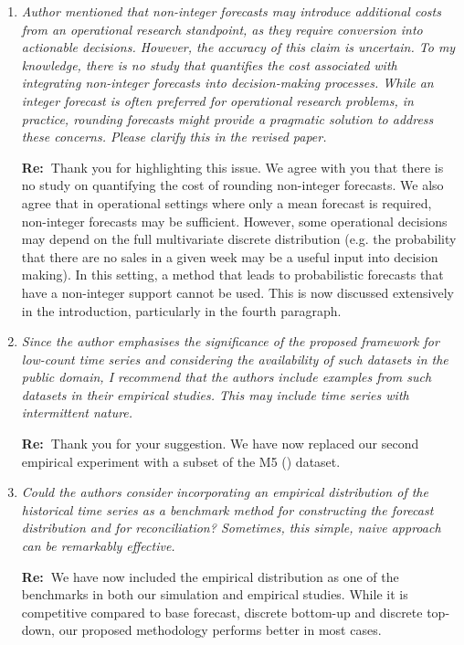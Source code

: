 \documentclass[11pt,a4paper]{article}
\newcommand{\RE}[2][Re:~]{{\color{blue}\textbf{#1}#2}}
\begin{document}
\begin{enumerate}
  \item \textit{Author mentioned that non-integer forecasts may introduce additional costs from an operational research standpoint, as they require conversion into actionable decisions. However, the accuracy of this claim is uncertain. To my knowledge, there is no study that quantifies the cost associated with integrating non-integer forecasts into decision-making processes. While an integer forecast is often preferred for operational research problems, in practice, rounding forecasts might provide a pragmatic solution to address these concerns. Please clarify this in the revised paper.}
  
  \RE{Thank you for highlighting this issue. We agree with you that there is no study on quantifying the cost of rounding non-integer forecasts. We also agree that in operational settings where only a mean forecast is required, non-integer forecasts may be sufficient. However, some operational decisions may depend on the full multivariate discrete distribution (e.g. the probability that there are no sales in a given week may be a useful input into decision making). In this setting, a method that leads to probabilistic forecasts that have a non-integer support cannot be used. This is now discussed extensively in the introduction, particularly in the fourth paragraph.}

  \item \textit{Since the author emphasises the significance of the proposed framework for low-count time series and considering the availability of such datasets in the public domain, I recommend that the authors include examples from such datasets in their empirical studies. This may include time series with intermittent nature.}
  
  \RE{Thank you for your suggestion. We have now replaced our second empirical experiment with a subset of the M5 (\citealp{makridakisM5AccuracyCompetition2022}) dataset.}

  \item \textit{Could the authors consider incorporating an empirical distribution of the historical time series as a benchmark method for constructing the forecast distribution and for reconciliation? Sometimes, this simple, naive approach can be remarkably effective.}
  
  \RE{We have now included the empirical distribution as one of the benchmarks in both our simulation and empirical studies. While it is competitive compared to base forecast, discrete bottom-up and discrete top-down, our proposed methodology performs better in most cases.}
  

\end{enumerate}
\end{document}
